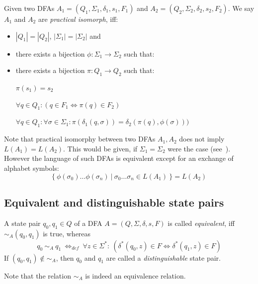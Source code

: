 Given two DFAs $A_1 = (Q_1, \Sigma_1, \delta_1, s_1, F_1)$ and $A_2 = (Q_2, \Sigma_2, \delta_2, s_2, F_2)$. We say $A_1$ and $A_2$ are \emph{practical isomorph}, iff:
\begin{itemize}
	\item $|Q_1| = |Q_2|$, $|\Sigma_1| = |\Sigma_2|$ and
	\item there exists a bijection $\phi\colon \Sigma_1 \to \Sigma_2$ such that:
	\item there exists a bijection $\pi\colon Q_1 \to Q_2$ such that:
	
	$\pi(s_1) = s_2$
	
	$\forall q\in Q_1\colon (q\in F_1 \Longleftrightarrow \pi(q)\in F_2)$
	
	$\forall q\in Q_1\colon \forall\sigma\in\Sigma_1\colon \pi(\delta_1(q,\sigma))=\delta_2(\pi(q),\phi(\sigma)))$
\end{itemize}
Note that practical isomorphy between two DFAs $A_1, A_2$ does not imply $L(A_1) = L(A_2)$. This would be given, if $\Sigma_1 = \Sigma_2$ were the case (see~\cite[p. 45]{schoening01}). However the language of such DFAs is equivalent except for an exchange of alphabet symbols:
\[
	\{\ \phi(\sigma_0)\ldots\phi(\sigma_n)\ |\ \sigma_0\ldots\sigma_n\in L(A_1)\ \} = L(A_2)
\]

\subsection{Equivalent and distinguishable state pairs}

\begin{definition}\cite[p. 154]{hopcroft01}
	A state pair $q_0, q_1 \in Q$ of a DFA $A = (Q, \Sigma, \delta, s, F)$ is called \emph{equivalent}, iff $\sim_A(q_0, q_1)$ is true, whereas
	\begin{displaymath}
	q_0\ \sim_A\ q_1\ \Leftrightarrow_{def}\ \forall z \in \Sigma^* \colon\ (\delta^*(q_0, z) \in F \Leftrightarrow \delta^*(q_1, z) \in F)
	\end{displaymath}
	If $(q_0, q_1) \notin \sim_A$, then $q_0$ and $q_1$ are called a \emph{distinguishable} state pair.
\end{definition}
\noindent Note that the relation $\sim_A$ is indeed an equivalence relation.

